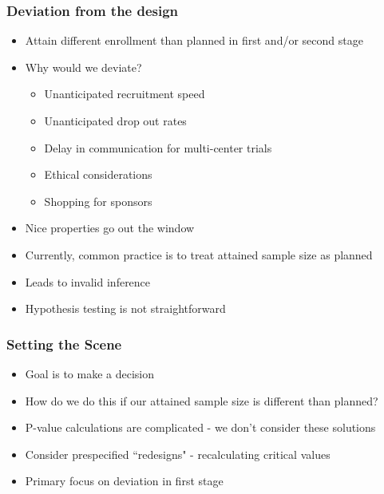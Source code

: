 \documentclass{beamer}\usepackage[]{graphicx}\usepackage[]{color}
\begin{document}
\begin{frame}
\frametitle{Deviation from the design}
    \begin{itemize}
        \item Attain different enrollment than planned in first and/or second stage
        \item Why would we deviate?
          \begin{itemize}
            \item Unanticipated recruitment speed
            \item Unanticipated drop out rates
            \item Delay in communication for multi-center trials
            \item Ethical considerations
            \item Shopping for sponsors
          \end{itemize}
        \item Nice properties go out the window
        \item Currently, common practice is to treat attained sample size as planned
        \item Leads to invalid inference
        \item Hypothesis testing is not straightforward
    \end{itemize}
\end{frame}

\begin{frame}
\frametitle{Setting the Scene}
    \begin{itemize}
        \item Goal is to make a decision
        \item How do we do this if our attained sample size is different than planned?
        \item P-value calculations are complicated - we don't consider these solutions
        \item Consider prespecified ``redesigns" - recalculating critical values
        \item Primary focus on deviation in first stage
    \end{itemize}
\end{frame}
\end{document}
